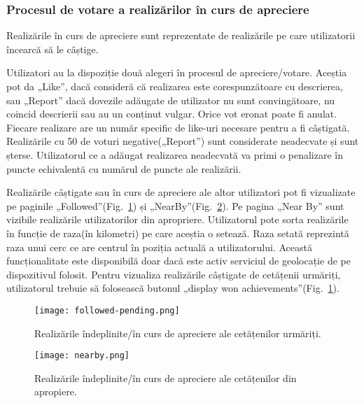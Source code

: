 \subsubsection{Procesul de votare a realizărilor în curs de apreciere}

    Realizările în curs de apreciere sunt reprezentate de realizările pe care utilizatorii încearcă să le câștige.

    Utilizatori au la dispoziție două alegeri în procesul de apreciere/votare. Aceștia pot da „Like”, dacă 
    consideră că realizarea este corespunzătoare cu descrierea, sau „Report” dacă dovezile adăugate de utilizator 
    nu sunt convingătoare, nu coincid descrierii sau au un conținut vulgar. Orice vot eronat poate fi anulat.
    Fiecare realizare are un număr specific de like-uri necesare pentru a fi câștigată. 
    Realizările cu 50 de voturi negative(„Report”) sunt considerate neadecvate și sunt șterse. 
    Utilizatorul ce a adăugat realizarea neadecvată va primi o penalizare în puncte echivalentă cu numărul de puncte 
    ale realizării.

    Realizările câștigate sau în curs de apreciere ale altor utilizatori pot fi vizualizate pe paginile 
    „Followed”(Fig.~\ref{fig:followed-pending}) și „NearBy”(Fig.~\ref{fig:nearby}). Pe pagina „Near By” sunt vizibile realizările 
    utilizatorilor din apropriere. Utilizatorul pote sorta realizările în funcție de raza(în kilometri) pe care aceștia o setează. 
    Raza setată reprezintă raza unui cerc ce are centrul în poziția actuală a utilizatorului. Această funcționalitate este 
    disponibilă doar dacă este activ serviciul de geolocație de pe dispozitivul folosit.
    Pentru vizualiza realizările câștigate de cetățenii urmăriți, utilizatorul trebuie să folosească 
    butonul „display won achievements”(Fig.~\ref{fig:followed-pending}).
    \begin{figure}[h]
    \texttt{[image: followed-pending.png]}
    \centering
    \caption{Realizările îndeplinite/în curs de apreciere ale cetățenilor urmăriți.}
    \label{fig:followed-pending}
    \end{figure} 
    \begin{figure}[h]
    \texttt{[image: nearby.png]}
    \centering
    \caption{Realizările îndeplinite/în curs de apreciere ale cetățenilor din apropiere.}
    \label{fig:nearby}
    \end{figure} 
\pagebreak
